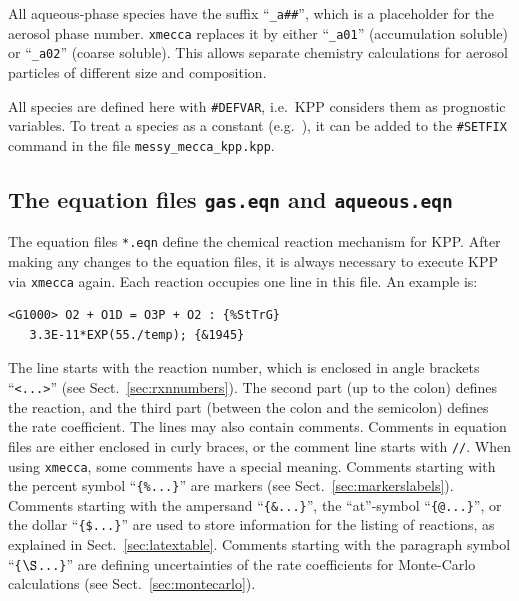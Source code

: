\documentclass[twoside]{article}
\begin{document}
All aqueous-phase species have the suffix ``\verb|_a##|'', which is a
placeholder for the aerosol phase number. \verb|xmecca| replaces it by
either ``\verb|_a01|'' (accumulation soluble) or ``\verb|_a02|'' (coarse
soluble). This allows separate chemistry calculations for aerosol
particles of different size and composition.

All species are defined here with \verb|#DEFVAR|, i.e.\ KPP considers
them as prognostic variables. To treat a species as a constant (e.g.\ 
), it can be added to the \verb|#SETFIX| command in the file
\verb|messy_mecca_kpp.kpp|.

\subsection{The equation files {\tt gas.eqn} and {\tt aqueous.eqn}}
\label{sec:eqnfiles}

The equation files \verb|*.eqn| define the chemical reaction mechanism
for KPP. After making any changes to the equation files, it is always
necessary to execute KPP via \verb|xmecca| again. Each reaction occupies
one line in this file. An example is:

\begin{verbatim}
<G1000> O2 + O1D = O3P + O2 : {%StTrG}
   3.3E-11*EXP(55./temp); {&1945}
\end{verbatim}

The line starts with the reaction number, which is enclosed in angle
brackets ``\verb|<...>|'' (see Sect.~\ref{sec:rxnnumbers}). The second
part (up to the colon) defines the reaction, and the third part (between
the colon and the semicolon) defines the rate coefficient. The lines may
also contain comments. Comments in equation files are either enclosed in
curly braces, or the comment line starts with \verb|//|. When using
\verb|xmecca|, some comments have a special meaning. Comments starting
with the percent symbol ``\verb|{%...}|''
  are markers (see Sect.~\ref{sec:markerslabels}). Comments starting
  with the ampersand ``\verb|{&...}|'', the ``at''-symbol
  ``\verb|{@...}|'', or the dollar ``\verb|{$...}|'' are used to store
  information for the listing of reactions, as explained in
  Sect.~\ref{sec:latextable}. Comments starting with the paragraph
  symbol ``\verb|{|$\S$\verb|...}|'' are defining uncertainties of the
  rate coefficients for Monte-Carlo calculations (see
  Sect.~\ref{sec:montecarlo}).
\end{document}
